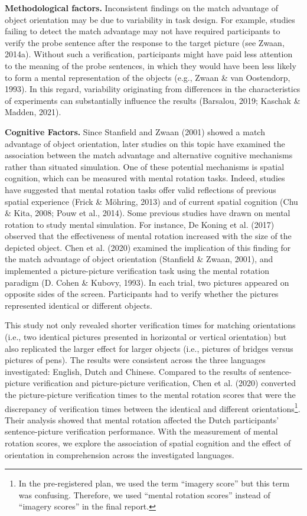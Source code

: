 \documentclass[
  man,floatsintext]{apa7}
\begin{document}
\textbf{Methodological factors.} Inconsistent findings on the match advantage
of object orientation may be due to variability in task design. For
example, studies failing to detect the match advantage may not have
required participants to verify the probe sentence after the response to
the target picture (see Zwaan, 2014a). Without such a
verification, participants might have paid less attention to the meaning
of the probe sentences, in which they would have been less likely to
form a mental representation of the objects (e.g., Zwaan \& van Oostendorp, 1993). In this regard, variability
originating from differences in the characteristics of experiments can
substantially influence the results
(Barsalou, 2019; Kaschak \& Madden, 2021).

\textbf{Cognitive Factors.} Since Stanfield and Zwaan (2001) showed a match
advantage of object orientation, later studies on this topic have
examined the association between the match advantage and alternative
cognitive mechanisms rather than situated simulation. One of these
potential mechanisms is spatial cognition, which can be measured with
mental rotation tasks. Indeed, studies have suggested that mental
rotation tasks offer valid reflections of previous spatial experience
(Frick \& Möhring, 2013) and of current spatial cognition
(Chu \& Kita, 2008; Pouw et al., 2014). Some
previous studies have drawn on mental rotation to study mental
simulation. For instance, De Koning et al. (2017) observed that the
effectiveness of mental rotation increased with the size of the depicted
object. Chen et al. (2020) examined the implication of this finding
for the match advantage of object orientation (Stanfield \& Zwaan, 2001),
and implemented a picture-picture verification task using the mental
rotation paradigm (D. Cohen \& Kubovy, 1993). In each trial, two
pictures appeared on opposite sides of the screen. Participants had to
verify whether the pictures represented identical or different objects.

This study not only revealed shorter verification times for matching
orientations (i.e., two identical pictures presented in horizontal or
vertical orientation) but also replicated the larger effect for larger
objects (i.e., pictures of bridges versus pictures of pens). The results
were consistent across the three languages investigated: English, Dutch
and Chinese. Compared to the results of sentence-picture verification
and picture-picture verification, Chen et al. (2020) converted the
picture-picture verification times to the mental rotation scores that
were the discrepancy of verification times between the identical and
different orientations\footnote{In the pre-registered plan, we used the term ``imagery score'' but
  this term was confusing. Therefore, we used ``mental rotation scores''
  instead of ``imagery scores'' in the final report.}. Their analysis showed that mental rotation
affected the Dutch participants' sentence-picture verification
performance. With the measurement of mental rotation scores, we explore
the association of spatial cognition and the effect of orientation in
comprehension across the investigated languages.
\end{document}
